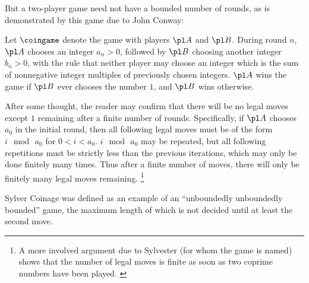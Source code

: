 
But a two-player game need not have a bounded number of rounds, as is
demonstrated by this game due to John Conway:
\cite{winning_ways}

\begin{game}
  Let $\coingame$ denote the game  with players 
  $\pl A$ and $\pl B$. During round $n$, $\pl A$ chooses an integer $a_n>0$,
  followed by $\pl B$ choosing another integer $b_n>0$, with the rule that
  neither player may choose an integer which is the sum of nonnegative integer 
  multiples of previously chosen integers. $\pl A$ wins the game if $\pl B$
  ever chooses the number $1$, and $\pl B$ wins otherwise.
\end{game}

After some thought, the reader may confirm that there will be no 
legal moves except $1$ remaining after a finite number of rounds. 
Specifically, if $\pl A$
chooses $a_0$ in the initial round, then all following legal moves must be
of the form $i \mod\, a_0$ for $0<i<a_0$. $i \mod\, a_0$ may be repeated,
but all following repetitions must be strictly less than the previous
iterations, which may only be done finitely many times. Thus after a finite 
number of moves, there will only be finitely many legal moves remaining. 
\footnote{
  A more involved
  argument due to Sylvester (for whom the game is named)
  shows that the number of legal moves 
  is finite as soon as two coprime numbers have been played. \cite{sylvester}
}

Sylver Coinage was defined as an example of an ``unboundedly unboundedly 
bounded'' game, the maximum length of which is not decided until at least
the second move.
